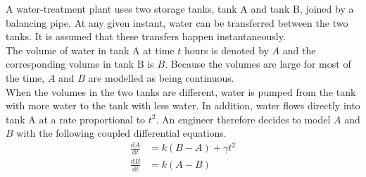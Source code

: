 \documentclass[leqno]{article}
\begin{document}
\begin{enumerate}[
  label=\textbf{\arabic*.},
  leftmargin=*,
  topsep=0pt,
  partopsep=0pt,
  parsep=0pt
]
A water-treatment plant uses two storage tanks, tank A and tank B, joined by a balancing pipe. At any given instant, water can be transferred between the two tanks. It is assumed that these transfers happen instantaneously. \\

The volume of water in tank A at time $t$ hours is denoted by $A$ and the corresponding volume in tank B is $B$. Because the volumes are large for most of the time, $A$ and $B$ are modelled as being continuous. \\

When the volumes in the two tanks are different, water is pumped from the tank with more water to the tank with less water. In addition, water flows directly into tank A at a rate proportional to $t^2$. An engineer therefore decides to model $A$ and $B$ with the following coupled differential equations. \\

\begin{align*}
\frac{\mathrm{d}A}{\mathrm{d}t}&=k(B-A)+\gamma t^2 \\
\frac{\mathrm{d}B}{\mathrm{d}t}&=k(A-B)
\end{align*} \\


\end{enumerate}
\end{document}
